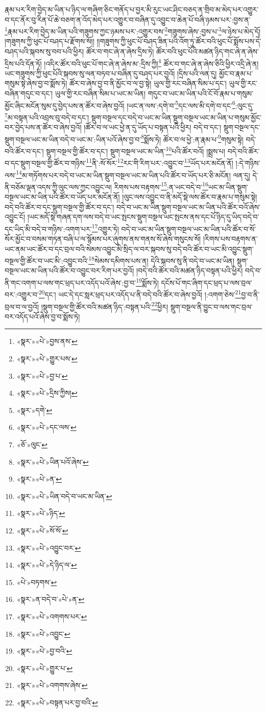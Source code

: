 རྣམ་པར་རིག་བྱེད་མ་ཡིན་པ་ཉིད་ལ་གཞིག་ཅིང་གནོད་པ་བྱར་མི་རུང་ཡང་ཤིང་བཅད་ན་གྲིབ་མ་མེད་པར་འགྱུར་བ་དང་ནོར་བུ་རིན་པོ་ཆེ་བཅག་ན་འོད་མེད་པར་འགྱུར་བ་བཞིན་དུ་འབྱུང་བ་ཆེན་པོ་བཞི་ཉམས་པར་:བྱས་ན་\footnote{«སྣར་»«པེ་»བྱས་ནས་}རྣམ་པར་རིག་བྱེད་མ་ཡིན་པའི་གཟུགས་ཀྱང་ཉམས་པར་:འགྱུར་བས་\footnote{«སྣར་»«པེ་»གྱུར་པས་}གཟུགས་ཞེས་:བྱས་པ་\footnote{«སྣར་»«པེ་»བྱ་པ་}ལ་ཉེས་པ་མེད་དོ། །གཟུགས་ཀྱི་ཕུང་པོ་བཤད་པ་རྫོགས་སོ།། །།གཟུགས་ཀྱི་ཕུང་པོ་བཤད་ཟིན་པའི་འོག་ཏུ་ཚོར་བའི་ཕུང་པོ་སྨོས་པས་དེ་བཤད་པའི་སྐབས་སུ་བབ་པའི་ཕྱིར། ཚོར་བ་གང་ཞེ་ན་ཞེས་དྲིས་ཏེ། ཚོར་བའི་ཕུང་པོའི་མཚན་ཉིད་གང་ཞེ་ན་ཞེས་དྲིས་པའི་དོན་ཏོ། །འདིར་ཚོར་བའི་ཕུང་པོ་གང་ཞེ་ན་ཞེས་མ་:དྲིས་ཀྱི།\footnote{«སྣར་»«པེ་»དྲིས་ཀྱིས།} ཚོར་བ་གང་ཞེ་ན་ཞེས་ཅིའི་ཕྱིར་འདྲི་ཞེ་ན། ཡང་གཟུགས་ཀྱི་ཕུང་པོའི་སྐབས་སུ་ལན་བཏབ་པ་བཞིན་དུ་བཤད་པར་བྱའོ། །དྲིས་པའི་ལན་དུ། མྱོང་བ་རྣམ་པ་གསུམ་སྟེ་ཞེས་བྱ་བ་སྨོས་ཏེ། ཚོར་བ་ཞེས་བྱ་བ་ནི་མྱོང་བ་ལ་བྱ་སྟེ། ཡུལ་གྱི་རང་བཞིན་སིམ་པ་དང་། ཡུལ་གྱི་རང་བཞིན་གདུང་བ་དང་། ཡུལ་གྱི་རང་བཞིན་སིམ་པ་ཡང་མ་ཡིན། གདུང་བ་ཡང་མ་ཡིན་པའི་ངོ་བོ་རྣམ་པ་གསུམ་མྱོང་ཞིང་མངོན་སུམ་དུ་བྱེད་པས་ན་ཚོར་བ་ཞེས་བྱའོ། །ཡང་ན་ལས་:དགེ་བ་\footnote{«སྣར་»དགེ་}དང་ལས་མི་དགེ་བ་དང་\footnote{«སྣར་»«པེ་»དང་ལས་}:ལུང་དུ་\footnote{«ཅོ་»ལུང་}མ་བསྟན་པའི་འབྲས་བུ་བདེ་བ་དང་། སྡུག་བསྔལ་དང་བདེ་བ་ཡང་མ་ཡིན་སྡུག་བསྔལ་ཡང་མ་ཡིན་པ་གསུམ་མྱོང་བར་བྱེད་པས་ན་ཚོར་བ་ཞེས་བྱའོ། །ཚོར་བ་ལ་ཡང་ཕྱེ་ན་དུ་ཡོད་པ་བསྟན་པའི་ཕྱིར། བདེ་བ་དང་། སྡུག་བསྔལ་དང་སྡུག་བསྔལ་ཡང་མ་ཡིན་བདེ་བ་ཡང་མ་:ཡིན་པའོ་ཞེས་བྱ་བ་\footnote{«སྣར་»«པེ་»ཡིན་པའོ་ཞེས་}སྨོས་ཏེ། ཚོར་བ་ལ་ཕྱེ་:ན་རྣམ་པ་\footnote{«སྣར་»«པེ་»ན་}གསུམ་སྟེ། བདེ་བའི་ཚོར་བ་དང་། སྡུག་བསྔལ་གྱི་ཚོར་བ་དང་། སྡུག་བསྔལ་ཡང་མ་ཡིན་\footnote{«སྣར་»«པེ་»ཡིན་བདེ་བ་ཡང་མ་ཡིན་}པའི་ཚོར་བའོ། །སྨྲས་པ། བདེ་བའི་ཚོར་བ་དང་སྡུག་བསྔལ་གྱི་ཚོར་བ་གཉིས་\footnote{«སྣར་»«པེ་»ཉིད་}ནི་:སོ་སོར་\footnote{«སྣར་»«པེ་»སོ་སོ་}རང་གི་རིག་པར་:འབྱུང་བ་\footnote{«སྣར་»«པེ་»འབྱུང་བར་}ཡོད་པར་མངོན་ནོ། །:དེ་གཉིས་ལས་\footnote{«སྣར་»«པེ་»དེ་ཉིད་ལ་}མ་གཏོགས་པར་བདེ་བ་ཡང་མ་ཡིན་སྡུག་བསྔལ་ཡང་མ་ཡིན་པའི་ཚོར་བ་ཡོད་པར་ཅི་མངོན། ལན་དུ། དེ་ནི་བཅོམ་ལྡན་འདས་ཀྱི་ལུང་ལས་ཀྱང་འབྱུང་ལ། རིགས་པས་བརྟགས་\footnote{«པེ་»བཏགས་}:ན་ཡང་བདེ་བ་\footnote{«སྣར་»ན་བདེ་བ་«པེ་»ན་}ཡང་མ་ཡིན་སྡུག་བསྔལ་ཡང་མ་ཡིན་པའི་ཚོར་བ་ཡོད་པར་མངོན་ནོ། །ལུང་ལས་འབྱུང་བ་ནི་མདོ་སྡེ་ལས་ཚོར་བ་རྣམ་པ་གསུམ་སྟེ། བདེ་བའི་ཚོར་བ་དང་སྡུག་བསྔལ་གྱི་ཚོར་བ་དང་། བདེ་བ་ཡང་མ་ཡིན་སྡུག་བསྔལ་ཡང་མ་ཡིན་པའི་ཚོར་བའོ་ཞེས་འབྱུང་ངོ། །ཡང་མདོ་སྡེ་གཞན་དག་ལས་བདེ་བ་ཡང་སྤངས་སྡུག་བསྔལ་ཡང་སྤངས་ནས་དང་པོ་ཉིད་དུ་ཡིད་བདེ་བ་དང་ཡིད་མི་བདེ་བ་གཉིས་:འགག་པར་\footnote{«སྣར་»«པེ་»འགགས་པར་}འགྱུར་ཏེ། བདེ་བ་ཡང་མ་ཡིན་སྡུག་བསྔལ་ཡང་མ་ཡིན་པའི་ཚོར་བ་སོ་སོར་མྱོང་བ་བསམ་གཏན་བཞི་པ་ལ་སྙོམས་པར་ཞུགས་ནས་གནས་སོ་ཞེས་གསུངས་སོ། །རིགས་པས་བརྟགས་ན་ཡང་ནམ་ཡང་ཚོར་བ་དང་བྲལ་བའི་སེམས་འབྱུང་མི་སྲིད་ལ་བར་སྐབས་སུ་བདེ་བའི་ཚོར་བ་ཡང་མི་འབྱུང་སྡུག་བསྔལ་གྱི་ཚོར་བ་ཡང་མི་:འབྱུང་བའི་\footnote{«སྣར་»«པེ་»འབྱུང་}སེམས་དམིགས་པས་ན། དེའི་སྐབས་སུ་ནི་བདེ་བ་ཡང་མ་ཡིན། སྡུག་བསྔལ་ཡང་མ་ཡིན་པའི་ཚོར་བ་འབྱུང་བར་རིག་པར་བྱའོ། །བདེ་བའི་ཚོར་བའི་མཚན་ཉིད་བསྟན་པའི་ཕྱིར། བདེ་བ་ནི་གང་འགག་པ་ལས་གང་ཕྲད་པར་འདོད་པའོ་ཞེས་:བྱ་བ་\footnote{«སྣར་»«པེ་»བྱ་བའི་}སྨོས་ཏེ། དངོས་པོ་གང་ཞིག་དང་ཕྲད་པ་ལས་བྲལ་བར་:འགྱུར་བ་\footnote{«སྣར་»«པེ་»གྱུར་པ་}དང་། ཡང་དེ་དང་སླར་ཕྲད་པར་འདོད་པ་ནི་བདེ་བའི་ཚོར་བ་ཞེས་བྱའོ། །:འགག་ཅེས་\footnote{«སྣར་»«པེ་»འགགས་ཞེས་}བྱ་བ་ནི་བྲལ་བ་ལ་བྱའོ། །སྡུག་བསྔལ་གྱི་ཚོར་བའི་མཚན་ཉིད་:བསྟན་པའི་\footnote{«སྣར་»«པེ་»བསྟན་པར་བྱ་བའི་}ཕྱིར། སྡུག་བསྔལ་ནི་བྱུང་བ་ལས་གང་བྲལ་བར་འདོད་པའོ་ཞེས་བྱ་བ་སྨོས་ཏེ། 